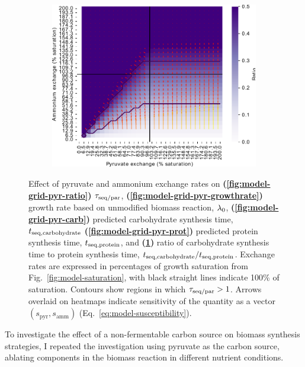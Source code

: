\begin{figure}
  \begin{subfigure}[t]{0.45\textwidth}
  \centering
    \includegraphics[width=\linewidth]{ec_grid_pyr_amm_carb_to_prot}
    \caption{
    }
    \label{fig:model-grid-pyr-carb-to-prot}
  \end{subfigure}
  \caption{
    Effect of pyruvate and ammonium exchange rates on \textbf{(\ref{fig:model-grid-pyr-ratio})} $\tau_{\mathrm{seq}/\mathrm{par}}$, \textbf{(\ref{fig:model-grid-pyr-growthrate})} growth rate based on unmodified biomass reaction, $\lambda_{0}$, \textbf{(\ref{fig:model-grid-pyr-carb})} predicted carbohydrate synthesis time, $t_{\mathrm{seq},\mathrm{carbohydrate}}$ \textbf{(\ref{fig:model-grid-pyr-prot})} predicted protein synthesis time, $t_{\mathrm{seq},\mathrm{protein}}$, and \textbf{(\ref{fig:model-grid-pyr-carb-to-prot})} ratio of carbohydrate synthesis time to protein synthesis time, $t_{\mathrm{seq},\mathrm{carbohydrate}}/t_{\mathrm{seq},\mathrm{protein}}$.
    Exchange rates are expressed in percentages of growth saturation from Fig.\ \ref{fig:model-saturation}, with black straight lines indicate 100\% of saturation.
    Contours show regions in which $\tau_{\mathrm{seq}/\mathrm{par}} > 1$.
    Arrows overlaid on heatmaps indicate sensitivity of the quantity as a vector $(s_{\mathrm{pyr}}, s_{\mathrm{amm}})$ (Eq.\ \ref{eq:model-susceptibility}).
  }
  \label{fig:model-grid-pyr}
\end{figure}

To investigate the effect of a non-fermentable carbon source on biomass synthesis strategies, I repeated the investigation using pyruvate as the carbon source, ablating components in the biomass reaction in different nutrient conditions.%

